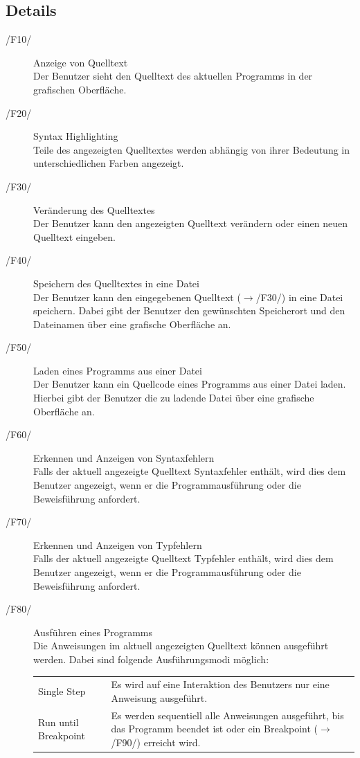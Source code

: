 \documentclass[a4paper,10pt]{article}
\begin{document}
\subsection{Details}
\begin{description}
\item[/F10/] Anzeige von Quelltext\\
Der Benutzer sieht den Quelltext des aktuellen Programms in der grafischen Oberfläche.
\item[/F20/] Syntax Highlighting\\
Teile des angezeigten Quelltextes werden abhängig von ihrer Bedeutung in unterschiedlichen Farben angezeigt.
\item[/F30/] Veränderung des Quelltextes\\
Der Benutzer kann den angezeigten Quelltext verändern oder einen neuen Quelltext eingeben.
\item[/F40/] Speichern des Quelltextes in eine Datei\\
Der Benutzer kann den eingegebenen Quelltext ($\to$/F30/) in eine Datei speichern. Dabei gibt der Benutzer den gewünschten Speicherort und den Dateinamen über eine grafische Oberfläche an.
\item[/F50/] Laden eines Programms aus einer Datei\\
Der Benutzer kann ein Quellcode eines Programms aus einer Datei laden. Hierbei gibt der Benutzer die zu ladende Datei über eine grafische Oberfläche an.
\item[/F60/] Erkennen und Anzeigen von Syntaxfehlern\\
Falls der aktuell angezeigte Quelltext Syntaxfehler enthält, wird dies dem Benutzer angezeigt, wenn er die Programmausführung oder die Beweisführung anfordert.
\item[/F70/] Erkennen und Anzeigen von Typfehlern\\
Falls der aktuell angezeigte Quelltext Typfehler enthält, wird dies dem Benutzer angezeigt, wenn er die Programmausführung oder die Beweisführung anfordert.
\item[/F80/] Ausführen eines Programms\\
Die Anweisungen im aktuell angezeigten Quelltext können ausgeführt werden. Dabei sind folgende Ausführungsmodi möglich:\\
\begin{tabularx}{\textwidth}{lX}
\leftskip=4cm
Single Step & Es wird auf eine Interaktion des Benutzers nur eine Anweisung ausgeführt.\\
Run until Breakpoint & Es werden sequentiell alle Anweisungen ausgeführt, bis das Programm beendet ist oder ein Breakpoint ($\to$/F90/) erreicht wird.\\

\end{tabularx}
\end{description}
\end{document}
